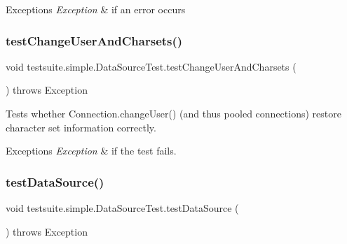 \begin{DoxyExceptions}{Exceptions}
{\em Exception} & if an error occurs \\
\hline
\end{DoxyExceptions}
\mbox{\label{classtestsuite_1_1simple_1_1_data_source_test_a238136c42e16d78196d3a6104c43cce5}} 
\subsubsection{\texorpdfstring{test\+Change\+User\+And\+Charsets()}{testChangeUserAndCharsets()}}
{\footnotesize\ttfamily void testsuite.\+simple.\+Data\+Source\+Test.\+test\+Change\+User\+And\+Charsets (\begin{DoxyParamCaption}{ }\end{DoxyParamCaption}) throws Exception}

Tests whether Connection.\+change\+User() (and thus pooled connections) restore character set information correctly.


\begin{DoxyExceptions}{Exceptions}
{\em Exception} & if the test fails. \\
\hline
\end{DoxyExceptions}
\mbox{\label{classtestsuite_1_1simple_1_1_data_source_test_aceabb67c36b42514892dc1a6a38eae1f}} 
\subsubsection{\texorpdfstring{test\+Data\+Source()}{testDataSource()}}
{\footnotesize\ttfamily void testsuite.\+simple.\+Data\+Source\+Test.\+test\+Data\+Source (\begin{DoxyParamCaption}{ }\end{DoxyParamCaption}) throws Exception}


